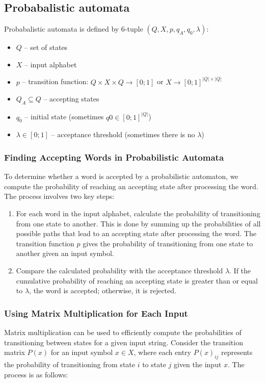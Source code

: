 \documentclass[hidelinks,12pt]{article}
\begin{document}
\subsection{Probabalistic automata}

Probabalistic automata is defined by 6-tuple $(Q,X,p,q_A, q_0, \lambda)$:

\begin{itemize}
	\item $Q$ – set of states
	\item $X$ – input alphabet
	\item $p$ – transition function: $Q \times X \times Q → [0;1]$ or $X \to {[0;1]}^{|Q|\times|Q|}$
	\item $Q_A \subseteq Q$ – accepting states
	\item $q_0$ – initial state (sometimes $q0 \in [0;1]^{|Q|}$)
	\item $\lambda \in [0;1]$ – acceptance threshold (sometimes there is no $\lambda$) 
\end{itemize}

\subsubsection{Finding Accepting Words in Probabilistic Automata}

To determine whether a word is accepted by a probabilistic automaton, we
compute the probability of reaching an accepting state after processing the
word. The process involves two key steps:

\begin{enumerate}
    \item For each word in the input alphabet, calculate the probability of transitioning from one state to another. This is done by summing up the probabilities of all possible paths that lead to an accepting state after processing the word. The transition function $p$ gives the probability of transitioning from one state to another given an input symbol.
    \item Compare the calculated probability with the acceptance threshold $\lambda$. If the cumulative probability of reaching an accepting state is greater than or equal to $\lambda$, the word is accepted; otherwise, it is rejected.
\end{enumerate}

\subsubsection{Using Matrix Multiplication for Each Input}
Matrix multiplication can be used to efficiently compute the probabilities of
transitioning between states for a given input string. Consider the transition
matrix $P(x)$ for an input symbol $x \in X$, where each entry $P(x)_{ij}$
represents the probability of transitioning from state $i$ to state $j$ given
the input $x$. The process is as follows:
\end{document}
